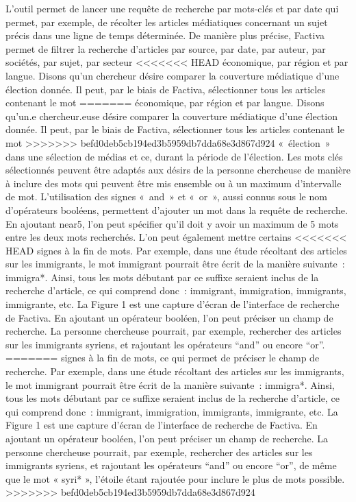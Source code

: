 \documentclass[
  letterpaper,
]{scrbook}
\begin{document}
L'outil permet de lancer une requête de recherche par mots-clés et par
date qui permet, par exemple, de récolter les articles médiatiques
concernant un sujet précis dans une ligne de temps déterminée. De
manière plus précise, Factiva permet de filtrer la recherche d'articles
par source, par date, par auteur, par sociétés, par sujet, par secteur
<<<<<<< HEAD
économique, par région et par langue. Disons qu'un chercheur désire
comparer la couverture médiatique d'une élection donnée. Il peut, par le
biais de Factiva, sélectionner tous les articles contenant le mot
=======
économique, par région et par langue. Disons qu'un.e chercheur.euse
désire comparer la couverture médiatique d'une élection donnée. Il peut,
par le biais de Factiva, sélectionner tous les articles contenant le mot
>>>>>>> befd0deb5cb194ed3b5959db7dda68e3d867d924
«~élection~» dans une sélection de médias et ce, durant la période de
l'élection. Les mots clés sélectionnés peuvent être adaptés aux désirs
de la personne chercheuse de manière à inclure des mots qui peuvent être
mis ensemble ou à un maximum d'intervalle de mot. L'utilisation des
signes «~and~» et «~or~», aussi connus sous le nom d'opérateurs
booléens, permettent d'ajouter un mot dans la requête de recherche. En
ajoutant near5, l'on peut spécifier qu'il doit y avoir un maximum de 5
mots entre les deux mots recherchés. L'on peut également mettre certains
<<<<<<< HEAD
signes à la fin de mots. Par exemple, dans une étude récoltant des
articles sur les immigrants, le mot immigrant pourrait être écrit de la
manière suivante~: immigra*. Ainsi, tous les mots débutant par ce
suffixe seraient inclus de la recherche d'article, ce qui comprend
donc~: immigrant, immigration, immigrants, immigrante, etc. La Figure 1
est une capture d'écran de l'interface de recherche de Factiva. En
ajoutant un opérateur booléen, l'on peut préciser un champ de recherche.
La personne chercheuse pourrait, par exemple, rechercher des articles
sur les immigrants syriens, et rajoutant les opérateurs ``and'' ou
encore ``or''.
=======
signes à la fin de mots, ce qui permet de préciser le champ de
recherche. Par exemple, dans une étude récoltant des articles sur les
immigrants, le mot immigrant pourrait être écrit de la manière
suivante~: immigra*. Ainsi, tous les mots débutant par ce suffixe
seraient inclus de la recherche d'article, ce qui comprend donc~:
immigrant, immigration, immigrants, immigrante, etc. La Figure 1 est une
capture d'écran de l'interface de recherche de Factiva. En ajoutant un
opérateur booléen, l'on peut préciser un champ de recherche. La personne
chercheuse pourrait, par exemple, rechercher des articles sur les
immigrants syriens, et rajoutant les opérateurs ``and'' ou encore
``or'', de même que le mot « syri* », l'étoile étant rajoutée pour
inclure le plus de mots possible.
>>>>>>> befd0deb5cb194ed3b5959db7dda68e3d867d924
\end{document}
